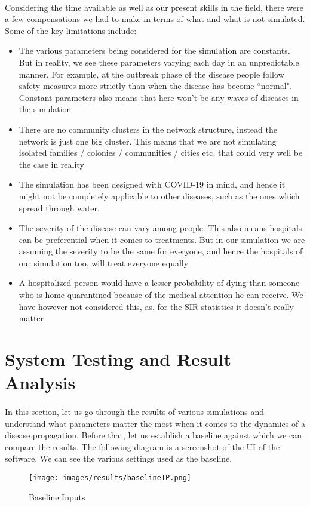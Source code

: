 \documentclass[12pt, a4paper]{extarticle}
\begin{document}
            \paragraph{} Considering the time available as well as our present skills in the field, there were a few compensations we had to make in terms of what and what is not simulated. Some of the key limitations include:
            \begin{itemize}
                \item The various parameters being considered for the simulation are constants. But in reality, we see these parameters varying each day in an unpredictable manner. For example, at the outbreak phase of the disease people follow safety measures more strictly than when the disease has become ``normal". Constant parameters also means that here won't be any waves of diseases in the simulation
				\item There are no community clusters in the network structure, instead the network is just one big cluster. This means that we are not simulating isolated families / colonies / communities / cities etc. that could very well be the case in reality
				\item The simulation has been designed with COVID-19 in mind, and hence it might not be completely applicable to other diseases, such as the ones which spread through water.
				\item The severity of the disease can vary among people. This also means hospitals can be preferential when it comes to treatments. But in our simulation we are assuming the severity to be the same for everyone, and hence the hospitals of our simulation too, will treat everyone equally
				\item A hospitalized person would have a lesser probability of dying than someone who is home quarantined because of the medical attention he can receive. We have however not considered this, as, for the SIR statistics it doesn't really matter 
            \end{itemize}
    
    \newpage
    \section{System Testing and Result Analysis}
    \paragraph{} In this section, let us go through the results of various simulations and understand what parameters matter the most when it comes to the dynamics of a disease propagation. Before that, let us establish a baseline against which we can compare the results. The following diagram is a screenshot of the UI of the software. We can see the various settings used as the baseline.
    \begin{figure}[h]
        \centering
        \texttt{[image: images/results/baselineIP.png]}
        \caption{Baseline Inputs}
    \end{figure}
   \newpage
\end{document}
